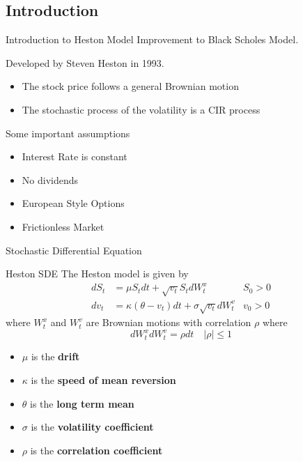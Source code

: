 \subsection{Introduction}
\begin{frame}{Introduction to Heston Model}
	Improvement to Black Scholes Model.
	\vspace{0.5cm}

	Developed by Steven Heston in 1993.
	\begin{itemize}
		\item The stock price follows a general Brownian motion
		\item The stochastic process of the volatility is a CIR process
	\end{itemize}
	\vspace{0.5cm}

	Some important assumptions
	\begin{itemize}
		\item Interest Rate is constant
		\item No dividends
		\item European Style Options
		\item Frictionless Market
	\end{itemize}
\end{frame}

\begin{frame}{Stochastic Differential Equation}
	\begin{block}{Heston SDE}
		The Heston model is given by
		\begin{align*}
			dS_t &= \mu S_t dt + \sqrt{v_t} S_t dW_t^x & S_0 > 0 \\
			dv_t &= \kappa(\theta - v_t)dt + \sigma \sqrt{v_t} dW_t^v & v_0 > 0
		\end{align*}
		where \( W_t^x \) and \( W_t^v \) are Brownian motions with correlation
		\( \rho \) where \[ dW_t^x dW_t^v = \rho dt \quad |\rho| \leq 1 \]
	\end{block}
	\begin{itemize}
		\item \( \mu \) is the \textbf{drift}
		\item \( \kappa \) is the \textbf{speed of mean reversion}
		\item \( \theta \) is the \textbf{long term mean}
		\item \( \sigma \) is the \textbf{volatility coefficient}
		\item \( \rho \) is the \textbf{correlation coefficient}
	\end{itemize}
\end{frame}

